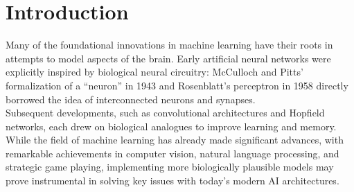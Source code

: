 \documentclass[a4paper,12pt]{report}
\begin{document}

\noindent 
\newpage
\thispagestyle{empty}\mbox{}\newpage

\setcounter{page}{1}

\tableofcontents
\newpage


\chapter*{Introduction}

Many of the foundational innovations in machine learning have their roots in attempts to model aspects 
of the brain. Early artificial neural networks were explicitly inspired by biological neural 
circuitry: McCulloch and Pitts' formalization of a ``neuron'' in 1943 and Rosenblatt's perceptron in 
1958 directly borrowed the idea of interconnected neurons and synapses. \\
Subsequent developments, such as convolutional architectures and Hopfield networks, each drew on 
biological analogues to improve learning and memory. While the field of machine learning has already 
made significant advances, with remarkable achievements in computer vision, natural language 
processing, and strategic game playing, implementing more biologically plausible models may prove 
instrumental in solving key issues with today's modern AI architectures.
\end{document}
